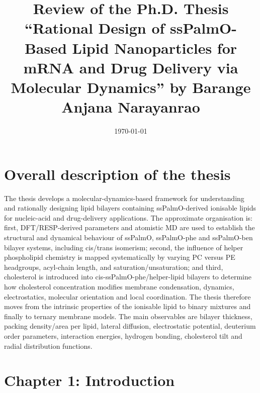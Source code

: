 \documentclass[11pt,a4paper]{article}
\title{\textbf{Review of the Ph.D. Thesis}\\[4pt]
\large ``Rational Design of ssPalmO-Based Lipid Nanoparticles for mRNA and Drug Delivery via Molecular Dynamics'' by Barange Anjana Narayanrao}
\date{\today}
\begin{document}
\maketitle


\section*{Overall description of the thesis}

The thesis develops a molecular-dynamics-based framework for understanding and rationally designing lipid bilayers containing ssPalmO-derived ionisable lipids for nucleic-acid and drug-delivery applications. The approximate organisation is: first, DFT/RESP-derived parameters and atomistic MD are used to establish the structural and dynamical behaviour of ssPalmO, ssPalmO-phe and ssPalmO-ben bilayer systems, including cis/trans isomerism; second, the influence of helper phospholipid chemistry is mapped systematically by varying PC versus PE headgroups, acyl-chain length, and saturation/unsaturation; and third, cholesterol is introduced into cis-ssPalmO-phe/helper-lipid bilayers to determine how cholesterol concentration modifies membrane condensation, dynamics, electrostatics, molecular orientation and local coordination. The thesis therefore moves from the intrinsic properties of the ionisable lipid to binary mixtures and finally to ternary membrane models. The main observables are bilayer thickness, packing density/area per lipid, lateral diffusion, electrostatic potential, deuterium order parameters, interaction energies, hydrogen bonding, cholesterol tilt and radial distribution functions.  

\section{Chapter 1: Introduction}
\end{document}
